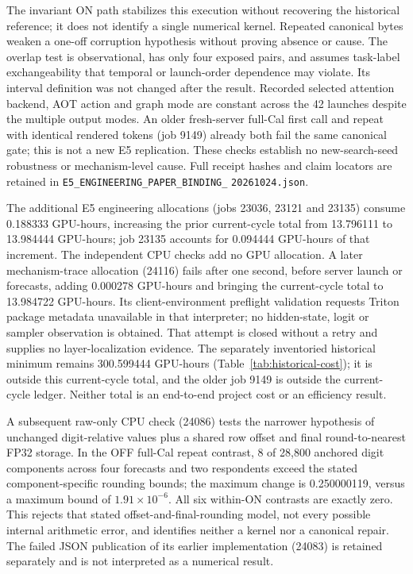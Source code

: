 The invariant ON path stabilizes this execution without recovering the
historical reference; it does not identify a single numerical kernel.
Repeated canonical bytes weaken a one-off corruption hypothesis without
proving absence or cause. The overlap test is observational, has only four
exposed pairs, and assumes task-label exchangeability that temporal or
launch-order dependence may violate. Its interval definition was not changed
after the result. Recorded selected attention backend, AOT action and graph
mode are constant across the 42 launches despite the multiple output modes.
An older fresh-server full-Cal first call and repeat with identical rendered
tokens (job 9149) already both fail the same canonical gate; this is not a new
E5 replication.
These checks establish no new-search-seed robustness or mechanism-level cause.
Full receipt hashes and claim locators are retained in
\texttt{E5\_ENGINEERING\_PAPER\_BINDING\_}\allowbreak
\texttt{20261024.json}.

The additional E5 engineering allocations (jobs 23036, 23121 and 23135)
consume 0.188333 GPU-hours, increasing the prior current-cycle total from
13.796111 to 13.984444 GPU-hours; job 23135 accounts for 0.094444 GPU-hours
of that increment. The independent CPU checks add no GPU allocation. A later mechanism-trace
allocation (24116) fails after one second, before server launch or forecasts,
adding 0.000278 GPU-hours and bringing the current-cycle total to
13.984722 GPU-hours. Its client-environment preflight validation requests
Triton package metadata unavailable in that interpreter; no hidden-state,
logit or sampler observation is obtained. That attempt is closed without a retry and supplies no layer-localization
evidence.
The separately inventoried historical minimum remains 300.599444 GPU-hours
(Table~\ref{tab:historical-cost}); it is outside this current-cycle total,
and the older job 9149 is outside the current-cycle ledger. Neither total is
an end-to-end project cost or an efficiency result.


A subsequent raw-only CPU check (24086) tests the narrower hypothesis of
unchanged digit-relative values plus a shared row offset and final
round-to-nearest FP32 storage. In the OFF full-Cal repeat contrast,
8 of 28,800 anchored digit components across four forecasts and two
respondents exceed the stated component-specific rounding bounds; the
maximum change is 0.250000119, versus a maximum bound of
$1.91\times10^{-6}$. All six within-ON contrasts are exactly zero.
This rejects that stated offset-and-final-rounding model, not every possible
internal arithmetic error, and identifies neither a kernel nor a canonical
repair. The failed JSON publication of its earlier implementation (24083)
is retained separately and is not interpreted as a numerical result.

